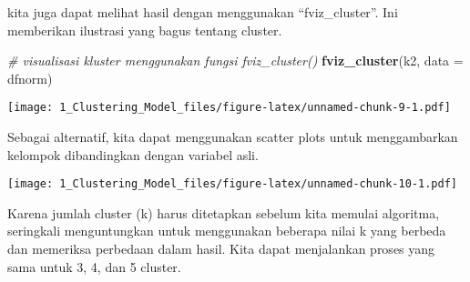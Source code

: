 \documentclass[]{article}
\newenvironment{Shaded}{\begin{snugshade}}{\end{snugshade}}
\newcommand{\CommentTok}[1]{\textcolor[rgb]{0.56,0.35,0.01}{\textit{#1}}}
\newcommand{\DataTypeTok}[1]{\textcolor[rgb]{0.13,0.29,0.53}{#1}}
\newcommand{\KeywordTok}[1]{\textcolor[rgb]{0.13,0.29,0.53}{\textbf{#1}}}
\newcommand{\NormalTok}[1]{#1}
\newcommand{\OperatorTok}[1]{\textcolor[rgb]{0.81,0.36,0.00}{\textbf{#1}}}
\newcommand{\StringTok}[1]{\textcolor[rgb]{0.31,0.60,0.02}{#1}}
\begin{document}
kita juga dapat melihat hasil dengan menggunakan ``fviz\_cluster''. Ini
memberikan ilustrasi yang bagus tentang cluster.

\begin{Shaded}
\begin{Highlighting}[]
\CommentTok{# visualisasi kluster menggunakan fungsi fviz_cluster()}
\KeywordTok{fviz_cluster}\NormalTok{(k2, }\DataTypeTok{data =}\NormalTok{ dfnorm)}
\end{Highlighting}
\end{Shaded}

\texttt{[image: 1\_Clustering\_Model\_files/figure-latex/unnamed-chunk-9-1.pdf]}

Sebagai alternatif, kita dapat menggunakan scatter plots untuk
menggambarkan kelompok dibandingkan dengan variabel asli.

\begin{Shaded}
\end{Shaded}

\texttt{[image: 1\_Clustering\_Model\_files/figure-latex/unnamed-chunk-10-1.pdf]}

Karena jumlah cluster (k) harus ditetapkan sebelum kita memulai
algoritma, seringkali menguntungkan untuk menggunakan beberapa nilai k
yang berbeda dan memeriksa perbedaan dalam hasil. Kita dapat menjalankan
proses yang sama untuk 3, 4, dan 5 cluster.
\end{document}
